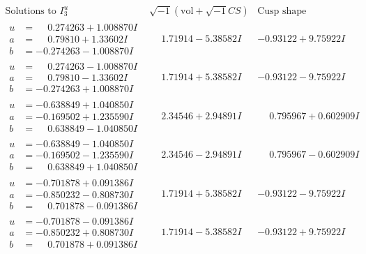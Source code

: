 \documentclass[1p]{elsarticle_modified}
\theoremstyle{definition}
\newcommand{\I}{\sqrt{-1}}
\begin{document}
$$\begin{array}{c|c|c}  
\text{Solutions to }I^u_{3}& \I (\text{vol} + \sqrt{-1}CS) & \text{Cusp shape}\\
 \hline 
\begin{aligned}
u &= \phantom{-}0.274263 + 1.008870 I \\
a &= \phantom{-}0.79810 + 1.33602 I \\
b &= -0.274263 - 1.008870 I\end{aligned}
 & \phantom{-}1.71914 - 5.38582 I & -0.93122 + 9.75922 I \\ \hline\begin{aligned}
u &= \phantom{-}0.274263 - 1.008870 I \\
a &= \phantom{-}0.79810 - 1.33602 I \\
b &= -0.274263 + 1.008870 I\end{aligned}
 & \phantom{-}1.71914 + 5.38582 I & -0.93122 - 9.75922 I \\ \hline\begin{aligned}
u &= -0.638849 + 1.040850 I \\
a &= -0.169502 + 1.235590 I \\
b &= \phantom{-}0.638849 - 1.040850 I\end{aligned}
 & \phantom{-}2.34546 + 2.94891 I & \phantom{-}0.795967 + 0.602909 I \\ \hline\begin{aligned}
u &= -0.638849 - 1.040850 I \\
a &= -0.169502 - 1.235590 I \\
b &= \phantom{-}0.638849 + 1.040850 I\end{aligned}
 & \phantom{-}2.34546 - 2.94891 I & \phantom{-}0.795967 - 0.602909 I \\ \hline\begin{aligned}
u &= -0.701878 + 0.091386 I \\
a &= -0.850232 - 0.808730 I \\
b &= \phantom{-}0.701878 - 0.091386 I\end{aligned}
 & \phantom{-}1.71914 + 5.38582 I & -0.93122 - 9.75922 I \\ \hline\begin{aligned}
u &= -0.701878 - 0.091386 I \\
a &= -0.850232 + 0.808730 I \\
b &= \phantom{-}0.701878 + 0.091386 I\end{aligned}
 & \phantom{-}1.71914 - 5.38582 I & -0.93122 + 9.75922 I \\ \hline\begin{aligned}

\end{aligned}
\end{array}$$
\end{document}
